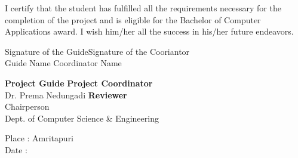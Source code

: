 \documentclass[oneside,12pt]{Classes/CUEDthesisPSnPDF}
\begin{document}
I certify that the student has fulfilled all the requirements necessary for the completion of the project and is eligible for the Bachelor of Computer Applications award. I wish him/her all the success in his/her future endeavors.



			


			

\vspace{0pt}

\begin{flushleft}
\vspace{5pt}
Signature of the Guide\hspace{120pt}Signature of the Cooriantor\\
Guide Name \hspace{165pt} Coordinator Name\\

\vspace{3pt}

\textbf{Project Guide} \hspace{151pt}\textbf{Project Coordinator}\\[5ex]

 
Dr. Prema Nedungadi  \hspace{118pt} \textbf{Reviewer}\\  Chairperson\\ Dept. of Computer Science \& Engineering \\[6ex]   
  

      

\end{flushleft}

\begin{flushleft}

\vspace{5pt}

Place	:	Amritapuri \\
Date	:	

\end{flushleft}
\end{document}
